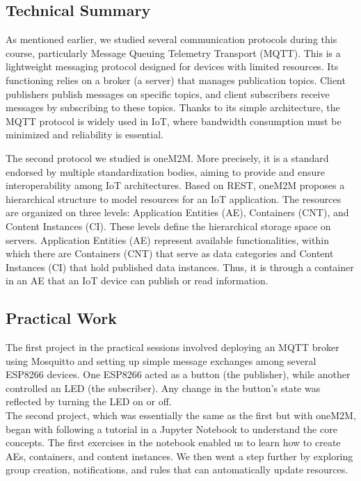 \subsection{Technical Summary}
As mentioned earlier, we studied several communication protocols during this course, particularly Message Queuing Telemetry Transport (MQTT). This is a lightweight messaging protocol designed for devices with limited resources. Its functioning relies on a broker (a server) that manages publication topics. Client publishers publish messages on specific topics, and client subscribers receive messages by subscribing to these topics.
Thanks to its simple architecture, the MQTT protocol is widely used in IoT, where bandwidth consumption must be minimized and reliability is essential.
\vspace{0.25cm}

The second protocol we studied is oneM2M. More precisely, it is a standard endorsed by multiple standardization bodies, aiming to provide and ensure interoperability among IoT architectures. Based on REST, oneM2M proposes a hierarchical structure to model resources for an IoT application. The resources are organized on three levels: Application Entities (AE), Containers (CNT), and Content Instances (CI). These levels define the hierarchical storage space on servers. Application Entities (AE) represent available functionalities, within which there are Containers (CNT) that serve as data categories and Content Instances (CI) that hold published data instances.
Thus, it is through a container in an AE that an IoT device can publish or read information.

\subsection{Practical Work}
The first project in the practical sessions involved deploying an MQTT broker using Mosquitto and setting up simple message exchanges among several ESP8266 devices. One ESP8266 acted as a button (the publisher), while another controlled an LED (the subscriber). Any change in the button’s state was reflected by turning the LED on or off.\\

The second project, which was essentially the same as the first but with oneM2M, began with following a tutorial in a Jupyter Notebook to understand the core concepts. The first exercises in the notebook enabled us to learn how to create AEs, containers, and content instances. We then went a step further by exploring group creation, notifications, and rules that can automatically update resources.\\

